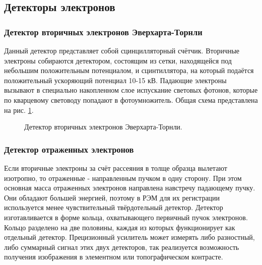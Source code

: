 \documentclass[a4paper,12pt]{article}	%
\begin{document}
    \subsection{Детекторы электронов}

        \subsubsection{Детектор вторичных электронов Эверхарта-Торнли}
        
\noindent Данный детектор представляет собой сцинцилляторный счётчик. Вторичные электроны собираются детектором, состоящим из сетки, находящейся под небольшим положительным потенциалом, и сцинтиллятора, на который подаётся положительный ускоряющий потенциал 10-15 кВ. Падающие электроны вызывают в специально накопленном слое испускание световых фотонов, которые по кварцевому световоду попадают в фотоумножитель. Общая схема представлена на рис. \ref{детектор ВЭ}.

            \begin{figure}
        	\caption{Детектор вторичных электронов Эверхарта-Торнли.}
        	\label{детектор ВЭ}
            \end{figure}        

        \subsubsection{Детектор отраженных электронов}
        
\noindent Если вторичные электроны за счёт рассеяния в толще образца вылетают изотропно, то отраженные - направленным пучком в одну сторону. При этом основная масса отраженных электронов направлена навстречу падающему пучку. Они обладают большей энергией, поэтому в РЭМ для их регистрации используется менее чувствительный твёрдотельный детектор. Детектор изготавливается в форме кольца, охватывающего первичный пучок электронов. Кольцо разделено на две половины, каждая из которых функционирует как отдельный детектор. Прецизионный усилитель может измерять либо разностный, либо суммарный сигнал этих двух детекторов, так реализуется возможность получения изображения в элементном или топографическом контрасте.
\end{document}
